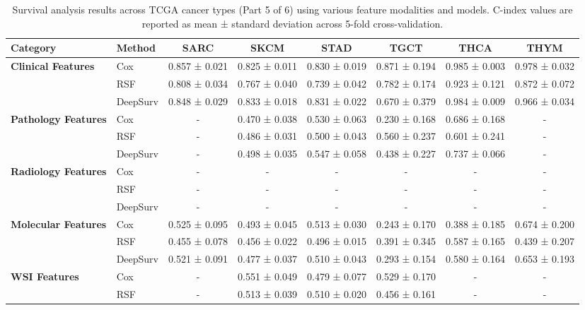 \begin{sidewaystable}[htbp]
    \centering
    \caption{Survival analysis results across TCGA cancer types (Part 5 of 6) using various feature modalities and models. C-index values are reported as mean ± standard deviation across 5-fold cross-validation.}
    \label{tab:survival_results_5}
    \begin{tabular}{@{}llcccccc@{}}
        \toprule
        \textbf{Category} & \textbf{Method} & \textbf{SARC} & \textbf{SKCM} & \textbf{STAD} & \textbf{TGCT} & \textbf{THCA} & \textbf{THYM} \\
        \midrule
        \multirow{3}{*}{\textbf{Clinical Features}} & Cox & 0.857 ± 0.021 & 0.825 ± 0.011 & 0.830 ± 0.019 & 0.871 ± 0.194 & 0.985 ± 0.003 & 0.978 ± 0.032 \\
        & RSF & 0.808 ± 0.034 & 0.767 ± 0.040 & 0.739 ± 0.042 & 0.782 ± 0.174 & 0.923 ± 0.121 & 0.872 ± 0.072 \\
        & DeepSurv & 0.848 ± 0.029 & 0.833 ± 0.018 & 0.831 ± 0.022 & 0.670 ± 0.379 & 0.984 ± 0.009 & 0.966 ± 0.034 \\
        \midrule
        \multirow{3}{*}{\textbf{Pathology Features}} & Cox & - & 0.470 ± 0.038 & 0.530 ± 0.063 & 0.230 ± 0.168 & 0.686 ± 0.168 & - \\
        & RSF & - & 0.486 ± 0.031 & 0.500 ± 0.043 & 0.560 ± 0.237 & 0.601 ± 0.241 & - \\
        & DeepSurv & - & 0.498 ± 0.035 & 0.547 ± 0.058 & 0.438 ± 0.227 & 0.737 ± 0.066 & - \\
        \midrule
        \multirow{3}{*}{\textbf{Radiology Features}} & Cox & - & - & - & - & - & - \\
        & RSF & - & - & - & - & - & - \\
        & DeepSurv & - & - & - & - & - & - \\
        \midrule
        \multirow{3}{*}{\textbf{Molecular Features}} & Cox & 0.525 ± 0.095 & 0.493 ± 0.045 & 0.513 ± 0.030 & 0.243 ± 0.170 & 0.388 ± 0.185 & 0.674 ± 0.200 \\
        & RSF & 0.455 ± 0.078 & 0.456 ± 0.022 & 0.496 ± 0.015 & 0.391 ± 0.345 & 0.587 ± 0.165 & 0.439 ± 0.207 \\
        & DeepSurv & 0.521 ± 0.091 & 0.477 ± 0.037 & 0.510 ± 0.043 & 0.293 ± 0.154 & 0.580 ± 0.164 & 0.653 ± 0.193 \\
        \midrule
        \multirow{3}{*}{\textbf{WSI Features}} & Cox & - & 0.551 ± 0.049 & 0.479 ± 0.077 & 0.529 ± 0.170 & - & - \\
        & RSF & - & 0.513 ± 0.039 & 0.510 ± 0.020 & 0.456 ± 0.161 & - & - \\

\end{tabular}
\end{sidewaystable}
